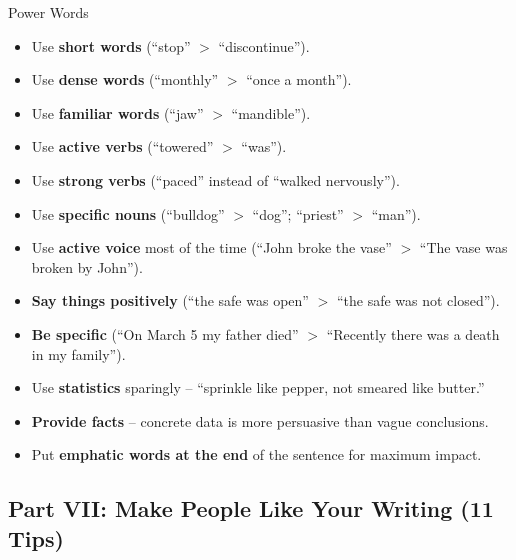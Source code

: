 \documentclass[12pt,a4paper]{article}
\begin{document}
\begin{tipbox}{Power Words}
\begin{itemize}[noitemsep]
    \item Use \textbf{short words} (``stop'' $>$ ``discontinue'').
    \item Use \textbf{dense words} (``monthly'' $>$ ``once a month'').
    \item Use \textbf{familiar words} (``jaw'' $>$ ``mandible'').
    \item Use \textbf{active verbs} (``towered'' $>$ ``was'').
    \item Use \textbf{strong verbs} (``paced'' instead of ``walked nervously'').
    \item Use \textbf{specific nouns} (``bulldog'' $>$ ``dog''; ``priest'' $>$ ``man'').
    \item Use \textbf{active voice} most of the time (``John broke the vase'' $>$ ``The vase was broken by John'').
    \item \textbf{Say things positively} (``the safe was open'' $>$ ``the safe was not closed'').
    \item \textbf{Be specific} (``On March 5 my father died'' $>$ ``Recently there was a death in my family'').
    \item Use \textbf{statistics} sparingly -- ``sprinkle like pepper, not smeared like butter.''
    \item \textbf{Provide facts} -- concrete data is more persuasive than vague conclusions.
    \item Put \textbf{emphatic words at the end} of the sentence for maximum impact.
\end{itemize}
\end{tipbox}

\subsection{Part VII: Make People Like Your Writing (11 Tips)}
\end{document}
